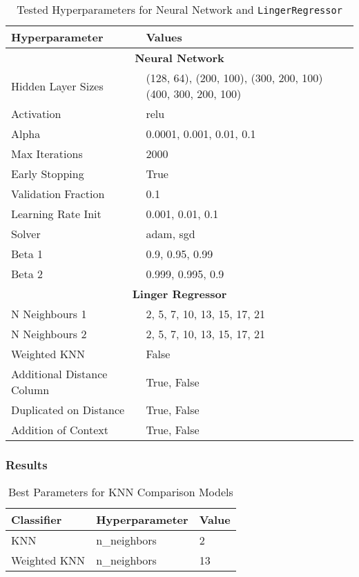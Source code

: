 \documentclass[a4paper, 12pt]{report}
\begin{document}
\begin{table}[H]
    \centering
    \caption{Tested Hyperparameters for Neural Network and \texttt{LingerRegressor}}
    \label{tab:hyperparameters_abalone}
    \begin{tabular}{|l|l|}
    \hline
    \textbf{Hyperparameter} & \textbf{Values} \\ \hline
    \multicolumn{2}{|c|}{\textbf{Neural Network}} \\ \hline
    Hidden Layer Sizes &  (128, 64), (200, 100), (300, 200, 100) (400, 300, 200, 100)\\ \hline
    Activation & relu \\ \hline
    Alpha & 0.0001, 0.001, 0.01, 0.1 \\ \hline
    Max Iterations & 2000 \\ \hline
    Early Stopping & True \\ \hline
    Validation Fraction & 0.1 \\ \hline
    Learning Rate Init & 0.001, 0.01, 0.1 \\ \hline
    Solver & adam, sgd \\ \hline
    Beta 1 & 0.9, 0.95, 0.99 \\ \hline
    Beta 2 & 0.999, 0.995, 0.9 \\ \hline
    \multicolumn{2}{|c|}{\textbf{Linger Regressor}} \\ \hline
    N Neighbours 1 & 2, 5, 7, 10, 13, 15, 17, 21 \\ \hline
    N Neighbours 2 & 2, 5, 7, 10, 13, 15, 17, 21 \\ \hline
    Weighted KNN & False \\ \hline
    Additional Distance Column & True, False \\ \hline
    Duplicated on Distance & True, False \\ \hline
    Addition of Context & True, False \\ \hline
    \end{tabular}
\end{table}
\clearpage

\subsubsection{Results}

\begin{table}[H]
    \centering
    \caption{Best Parameters for KNN Comparison Models}
    \label{tab:best_parameters_combined_knn_exp2}
    \begin{tabular}{|l|l|l|}
    \toprule
    \textbf{Classifier} & \textbf{Hyperparameter} & \textbf{Value} \\
    \midrule
    KNN & n\_neighbors & 2 \\
    Weighted KNN & n\_neighbors & 13 \\
    \bottomrule
\end{tabular}
\end{table}
\end{document}
